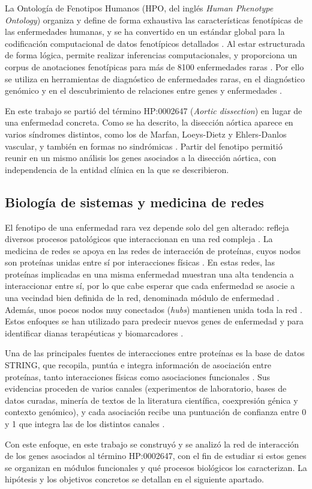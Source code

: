 La Ontología de Fenotipos Humanos (HPO, del inglés \textit{Human Phenotype Ontology}) organiza y define de forma exhaustiva las características fenotípicas de las enfermedades humanas, y se ha convertido en un estándar global para la codificación computacional de datos fenotípicos detallados \cite{Gargano2024}. Al estar estructurada de forma lógica, permite realizar inferencias computacionales, y proporciona un corpus de anotaciones fenotípicas para más de 8100 enfermedades raras \cite{Gargano2024}. Por ello se utiliza en herramientas de diagnóstico de enfermedades raras, en el diagnóstico genómico y en el descubrimiento de relaciones entre genes y enfermedades \cite{Gargano2024}.

En este trabajo se partió del término HP:0002647 (\textit{Aortic dissection}) en lugar de una enfermedad concreta. Como se ha descrito, la disección aórtica aparece en varios síndromes distintos, como los de Marfan, Loeys-Dietz y Ehlers-Danlos vascular, y también en formas no sindrómicas \cite{Pinard2019}. Partir del fenotipo permitió reunir en un mismo análisis los genes asociados a la disección aórtica, con independencia de la entidad clínica en la que se describieron.


\subsection{Biología de sistemas y medicina de redes}

El fenotipo de una enfermedad rara vez depende solo del gen alterado: refleja diversos procesos patológicos que interaccionan en una red compleja \cite{Barabasi2011}. La medicina de redes se apoya en las redes de interacción de proteínas, cuyos nodos son proteínas unidas entre sí por interacciones físicas \cite{Barabasi2011}. En estas redes, las proteínas implicadas en una misma enfermedad muestran una alta tendencia a interaccionar entre sí, por lo que cabe esperar que cada enfermedad se asocie a una vecindad bien definida de la red, denominada módulo de enfermedad \cite{Barabasi2011}. Además, unos pocos nodos muy conectados (\textit{hubs}) mantienen unida toda la red \cite{Barabasi2011}. Estos enfoques se han utilizado para predecir nuevos genes de enfermedad y para identificar dianas terapéuticas y biomarcadores \cite{Barabasi2011}.

Una de las principales fuentes de interacciones entre proteínas es la base de datos STRING, que recopila, puntúa e integra información de asociación entre proteínas, tanto interacciones físicas como asociaciones funcionales \cite{Szklarczyk2025}. Sus evidencias proceden de varios canales (experimentos de laboratorio, bases de datos curadas, minería de textos de la literatura científica, coexpresión génica y contexto genómico), y cada asociación recibe una puntuación de confianza entre 0 y 1 que integra las de los distintos canales \cite{Szklarczyk2025}.

Con este enfoque, en este trabajo se construyó y se analizó la red de interacción de los genes asociados al término HP:0002647, con el fin de estudiar si estos genes se organizan en módulos funcionales y qué procesos biológicos los caracterizan. La hipótesis y los objetivos concretos se detallan en el siguiente apartado.



